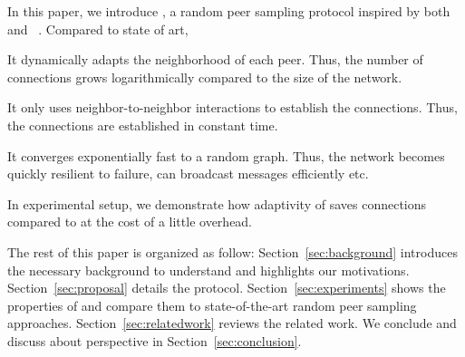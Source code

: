 In this paper, we introduce \SCAMPLON{}, a random peer sampling
protocol inspired by both \SCAMP{}~\cite{ganesh2003peer} and
\CYCLON{}~\cite{voulgaris2005cyclon}. Compared to state of art,
\begin{inparaenum}[(i)]
\item It dynamically adapts the neighborhood of each peer. Thus, the number of
  connections grows logarithmically compared to the size of the network.
\item It only uses neighbor-to-neighbor interactions to establish the
  connections. Thus, the connections are established in constant time.
\item It converges exponentially fast to a random graph. Thus, the network
  becomes quickly resilient to failure, can broadcast messages
  efficiently etc.
\item In experimental setup, we demonstrate how adaptivity of
  \SCAMPLON{} saves connections compared to\CYCLON{} at the cost of a
  little overhead.
\end{inparaenum}




The rest of this paper is organized as follow: Section~\ref{sec:background}
introduces the necessary background to understand \SCAMPLON{} and highlights
our motivations. Section~\ref{sec:proposal} details the \SCAMPLON{} protocol.
Section~\ref{sec:experiments} shows the properties of \SCAMPLON{} and compare
them to state-of-the-art random peer sampling
approaches. Section~\ref{sec:relatedwork} reviews the related work. We conclude
and discuss about perspective in Section~\ref{sec:conclusion}.

